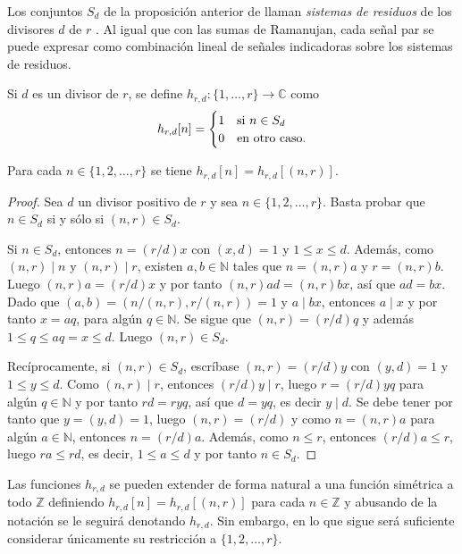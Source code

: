 Los conjuntos $S_d$ de la proposición anterior de llaman \emph{sistemas de residuos} de los divisores $d$ de $r$ \cite{Sam1}. Al igual que con las sumas de Ramanujan, cada señal par se puede expresar como combinación lineal de señales indicadoras sobre los sistemas de residuos.

\begin{definition}
Si $d$ es un divisor de $r$, se define $h_{r,d} : \{ 1,\ldots,r \} \longrightarrow \mathbb{C}$ como
\begin{equation*}
    h_{r,d}[n] = \begin{cases}
        \hfil 1 & \text{si } n \in S_d \\
        \hfil 0 & \text{en otro caso.}
    \end{cases}
\end{equation*}
\end{definition}

\begin{proposition}
Para cada $n \in \{ 1,2,\ldots,r \}$ se tiene $h_{r,d}[n]=h_{r,d}[(n,r)]$.
\end{proposition}

\begin{proof}
Sea $d$ un divisor positivo de $r$ y sea $n \in \{ 1,2,\ldots,r \}$. Basta probar que $n \in S_d$ si y sólo si $(n,r) \in S_d$.
\bigskip

Si $n \in S_d$, entonces $n=(r/d) x$ con $(x,d)=1$ y $1 \le x \le d$. Además, como $(n,r) \mid n$ y $(n,r) \mid r$, existen $a,b \in \mathbb{N}$ tales que $n = (n,r) a$  y $r = (n,r) b$. Luego $(n,r) a = (r/d) x$ y por tanto $(n,r) a d = (n,r) b x$, así que $a d = b x$. Dado que $(a,b)=(n/(n,r), r/(n,r))=1$ y $a \mid b x$, entonces $a \mid x$ y por tanto $x = a q$, para algún $q \in \mathbb{N}$. Se sigue que $(n,r) = (r/d) q$ y además $1 \le q \le a q = x \le d$. Luego $(n,r) \in S_d$.
\bigskip

Recíprocamente, si $(n,r) \in S_d$, escríbase $(n,r) = (r/d) y$ con $(y,d)=1$ y $1 \le y \le d$. Como $(n,r) \mid r$, entonces $(r/d) y \mid r$, luego $r = (r/d) y q$ para algún $q \in \mathbb{N}$ y por tanto $r d = r y q$, así que $d = y q$, es decir $y \mid d$. Se debe tener por tanto que $y=(y,d)=1$, luego $(n,r)=(r/d)$ y como $n=(n,r)a$ para algún $a \in \mathbb{N}$, entonces $n = (r/d)a$. Además, como $n \le r$, entonces $(r/d) a \le r$, luego $r a \le r d$, es decir, $1 \le a \le d$ y por tanto $n \in S_d$.
\end{proof}

Las funciones $h_{r,d}$ se pueden extender de forma natural a una función simétrica a todo $\mathbb{Z}$ definiendo $h_{r,d}[n] = h_{r,d}[(n,r)]$ para cada $n \in \mathbb{Z}$ y abusando de la notación se le seguirá denotando $h_{r,d}$. Sin embargo, en lo que sigue será suficiente considerar únicamente su restricción a $\{ 1,2,\ldots,r \}$.

